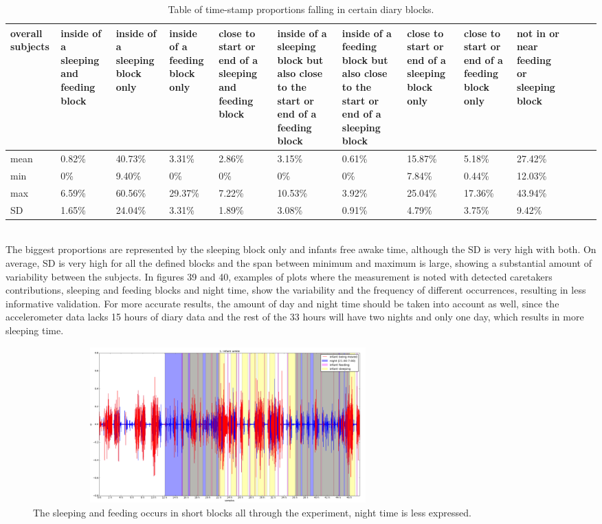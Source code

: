 \documentclass{article}
\begin{document}
{\begin{table}[h]\tiny
\centering
\begin{tabular}{|p{0.5cm}|p{1cm}|p{1cm}|p{1cm}|p{1.5cm}|p{1.5cm}|p{1.5cm}|p{1.2cm}|p{1cm}|p{1cm}|p{1cm}|p{1cm}|p{1cm}|}
\hline
overall subjects & inside of a sleeping and feeding block & inside of a sleeping block only & inside of a feeding block only & close to start or end of a sleeping and feeding block & inside of a sleeping block but also close to the start or end of a feeding block & inside of a feeding block but also close to the start or end of a sleeping block & close to start or end of a sleeping block only & close to start or end of a feeding block only & not in or near feeding or sleeping block \\ \hline
mean & 0.82\% & 40.73\% & 3.31\% & 2.86\% & 3.15\% & 0.61\% & 15.87\% & 5.18\% & 27.42\% \\ \hline
min & 0\% & 9.40\% & 0\% & 0\% & 0\% & 0\% & 7.84\% & 0.44\% & 12.03\% \\ \hline
max & 6.59\% & 60.56\% & 29.37\% & 7.22\% & 10.53\% & 3.92\% & 25.04\% & 17.36\% & 43.94\% \\ \hline
SD & 1.65\% & 24.04\% & 3.31\% & 1.89\% & 3.08\% & 0.91\% & 4.79\% & 3.75\% & 9.42\% \\ \hline
\end{tabular}
\caption{Table of time-stamp proportions falling in certain diary blocks. }
\end{table}
\\
The biggest proportions are represented by the sleeping block only and infants free awake time, although the SD is very high with both. On average, SD is very high for all the defined blocks and the span between minimum and maximum is large, showing a substantial amount of variability between the subjects. In figures 39 and 40, examples of plots where the measurement is noted with detected caretakers contributions, sleeping and feeding blocks and night time, show the variability and the frequency of different occurrences, resulting in less informative validation. For more accurate results, the amount of day and night time should be taken into account as well, since the accelerometer data lacks 15 hours of diary data and the rest of the 33 hours will have two nights and only one day, which results in more sleeping time.
\begin{figure}[h!]
\includegraphics[width=15cm, height=6cm]{1moved.png}
\caption{The sleeping and feeding occurs in short blocks all through the experiment, night time is less expressed. }
\end{figure}

}
\end{document}
